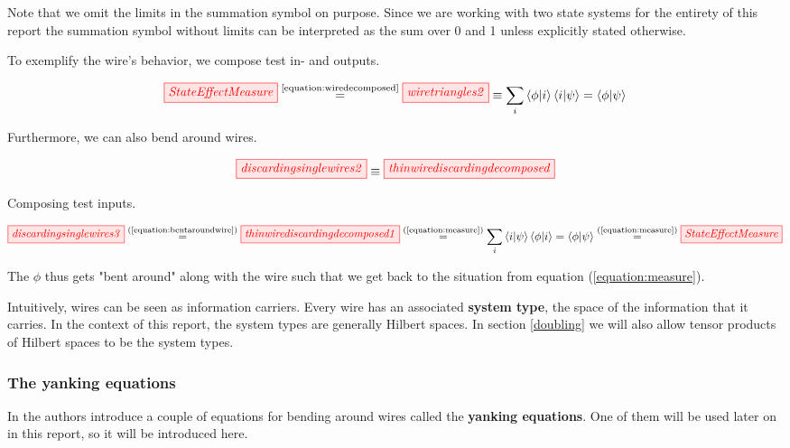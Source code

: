 \documentclass[]{article}
\newcommand{\equaltext}[1]{\ensuremath{\stackrel{\text{#1}}{=}}}
\begin{document}
Note that we omit the limits in the summation symbol on purpose. Since we are working with two state systems for the entirety of this report the summation symbol without limits can be interpreted as the sum over 0 and 1 unless explicitly stated otherwise. 

To exemplify the wire's behavior, we compose test in- and outputs.

\begin{equation}
\label{equation:measure}
\tikzfig{StateEffectMeasure} \equaltext{\ref{equation:wiredecomposed}}  \tikzfig{wiretriangles2} \equiv \sum_{i}\bra{\phi}\ket{i}\bra{i}\ket{\psi} = \bra{\phi}\ket{\psi}
\end{equation}

Furthermore, we can also bend around wires.

\begin{equation}
\label{equation:bentaroundwire}
\tikzfig{discardingsinglewires2} \equiv
\tikzfig{thinwirediscardingdecomposed} 
\end{equation}

Composing test inputs.

\begin{equation}
\label{equation:bentaroundwiresinandoutputs}
\tikzfig{discardingsinglewires3} \equaltext{(\ref{equation:bentaroundwire})} \tikzfig{thinwirediscardingdecomposed1} \equaltext{(\ref{equation:measure})} \sum_{i}\bra{i}\ket{\psi}\bra{\phi}\ket{i} = \bra{\phi}\ket{\psi} \equaltext{(\ref{equation:measure})} \tikzfig{StateEffectMeasure}
\end{equation}

The $\phi$ thus gets "bent around" along with the wire such that we get back to the situation from equation (\ref{equation:measure}). 

Intuitively, wires can be seen as information carriers. Every wire has an associated \textbf{system type}, the space of the information that it carries. In the context of this report, the system types are generally Hilbert spaces. In section \ref{doubling} we will also allow tensor products of Hilbert spaces to be the system types.

\subsubsection{The yanking equations}
\label{section:yankingequations}

In \cite{Coecke2017} the authors introduce a couple of equations for bending around wires called the \textbf{yanking equations}. One of them will be used later on in this report, so it will be introduced here.
\end{document}
